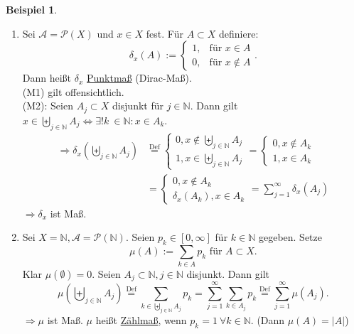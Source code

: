 \documentclass[a4paper]{report}
\newcommand{\PowerSet}{\mathcal{P}}
\newcommand{\N}{\mathbb{N}}
\newcommand{\bigdcup}{\biguplus}
\newcommand{\jlabel}[1]{\label{j_#1}}
\theoremstyle{plain}
\theoremstyle{definition}
\newtheorem{expl}[thm]{Beispiel}
\begin{document}
{{\jlabel{Bsp 1.13}
\begin{expl}
    \begin{enumerate}
        \item Sei $\mathcal{A} = \PowerSet(X)$ und $x \in X$ fest. Für $A \subset X$ definiere:
            \begin{displaymath}
                \delta_x(A) := \begin{cases} 1, & \mbox{für } x \in A \\ 0, & \mbox{für } x \notin A \end{cases}.
            \end{displaymath}
            Dann heißt $\delta_x$ \uline{Punktmaß} (Dirac-Maß).\\
            (M1) gilt offensichtlich.\\
            (M2): Seien $A_j \subset X$ disjunkt für $j \in \N$. Dann gilt $x \in \bigdcup_{j \in \N} A_j \Leftrightarrow \exists! k\ \in \N: x\in A_k$.
            \begin{displaymath}
                \begin{split}
                    \Rightarrow \delta_x(\bigdcup_{j \in \N} A_j) &\overset{\text{Def}}{=} \begin{cases} 0, x \notin \bigdcup_{j \in \N} A_j \\ 1, x\in \bigdcup_{j \in \N} A_j \end{cases} = \begin{cases} 0, x \notin A_k\\ 1, x\in A_k \end{cases} \\
                    &= \begin{cases}0, x\notin A_k\\ \delta_x(A_k), x \in A_k\end{cases} = \sum_{j=1}^\infty \delta_x(A_j)
                \end{split}
            \end{displaymath}
            $\Rightarrow \delta_x$ ist Maß.
            
        \item
            Sei $X = \N, \mathcal{A} = \PowerSet(\N)$. Seien $p_k \in [0,\infty]$ für $k\in\N$ gegeben. Setze 
            \begin{displaymath}
                \mu(A) := \sum_{k \in A} p_k\text{ für }A \subset X. 
            \end{displaymath}
            Klar $\mu(\emptyset) = 0$. Seien $A_j \subset \N, j\in\N$ disjunkt. Dann gilt
            \begin{displaymath}
                \mu \left (\bigdcup_{j\in\N} A_j \right) \overset{\text{Def}}{=} \sum_{k \in \bigdcup_{j\in\N} A_j} p_k = \sum_{j=1}^\infty \sum_{k\in A_j} p_k \overset{\text{Def}}{=} \sum_{j=1}^\infty \mu(A_j).
            \end{displaymath}
            $\Rightarrow \mu$ ist Maß. $\mu$ heißt \uline{Zählmaß}, wenn $p_k =1 \ \forall k\in \N$. (Dann $\mu(A) = |A|$)


\end{enumerate}
\end{expl}}}
\end{document}
